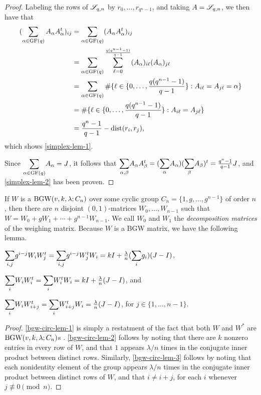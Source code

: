 \documentclass[../../../main]{subfiles}
\begin{document}
 \begin{proof}
  Labeling the rows of $\mathscr{S}_{q,n}$ by $r_0,\dots,r_{q^n-1}$, and taking $A=\mathscr{S}_{q,n}$, we then have that
  \begin{align*}
   (\sum_{\alpha\in\text{GF}(q)} A_\alpha A_\alpha^t)_{ij} &= \sum_{\alpha\in\text{GF}(q)}(A_\alpha A_\alpha^t)_{ij} \\
   &= \sum_{\alpha\in\text{GF}(q)} \sum_{\ell=0}^{\frac{q(q^{n-1}-1)}{q-1}}(A_\alpha)_{i\ell}(A_\alpha)_{j\ell} \\
   &= \sum_{\alpha\in\text{GF}(q)} \#\{\ell \in \{0,\dots,\frac{q(q^{n-1}-1)}{q-1}\} : A_{i\ell}=A_{j\ell}=\alpha\} \\
   &= \#\{\ell \in \{0,\dots,\frac{q(q^{n-1}-1)}{q-1}\} : A_{i\ell}=A_{j\ell}\} \\
   &= \frac{q^n-1}{q-1} - \text{dist}(r_i,r_j),
  \end{align*}
  which shows \ref{simplex-lem-1}.
  
  Since $\ssum_{\alpha\in\gf(q)}A_\alpha=J$, it follows that $\ssum_{\alpha,\beta}A_\alpha A_\beta^t = (\ssum_\alpha A_\alpha)(\ssum_\beta A_\beta)^t = \frac{q^n-1}{q-1}J$, and \ref{simplex-lem-2} has been proven.
 \end{proof}
 
 If $W$ is a $\text{BGW}(v,k,\lambda;C_n)$ over some cyclic group $C_n=\{1,g,\dots,g^{n-1}\}$ of order $n$, then there are $n$ disjoint $(0,1)$-matrices $W_0, \dots, W_{n-1}$ such that $W=W_0 + gW_1 + \cdots + g^{n-1}W_{n-1}$. We call $W_0$ and $W_1$ the {\it decomposition matrices} of the weighing matrix. Because $W$ is a BGW matrix, we have the following lemma.
 
 \begin{lem}\label{bgw-circ-lem}
  \begin{defenum}
   \item[]
   \item\label{bgw-circ-lem-1} $\ssum_{i,j}g^{i-j}W_iW_j^t = \ssum_{i,j}g^{i-j}W_j^tW_i = kI + \frac{\lambda}{n}(\ssum_ig_i)(J-I)$,
   \item\label{bgw-circ-lem-2} $\ssum_iW_iW_i^t = \ssum_iW_i^tW_i = kI +\frac{\lambda}{n}(J-I)$, and
   \item\label{bgw-circ-lem-3} $\ssum_iW_iW_{i+j}^t = \ssum_iW_{i+j}^tW_i = \frac{\lambda}{n}(J-I)$, for $j \in \{1,\dots,n-1\}$.
  \end{defenum}
 \end{lem}

 \begin{proof}
   \ref{bgw-circ-lem-1} is simply a restatment of the fact that both $W$ and $W^*$ are $\text{BGW}(v,k,\lambda;C_n)$s \cite[see][]{combinatorics-of-symmetric-designs}. \ref{bgw-circ-lem-2} follows by noting that there are $k$ nonzero entries in every row of $W$, and that $1$ appears $\lambda/n$ times in the conjugate inner product between distinct rows. Similarly, \ref{bgw-circ-lem-3} follows by noting that each nonidentity element of the group appears $\lambda/n$ times in the conjugate inner product between distinct rows of $W$, and that $i \neq i+j$, for each $i$ whenever $j \not\equiv 0 \pmod{n}$.
 \end{proof}
\end{document}
